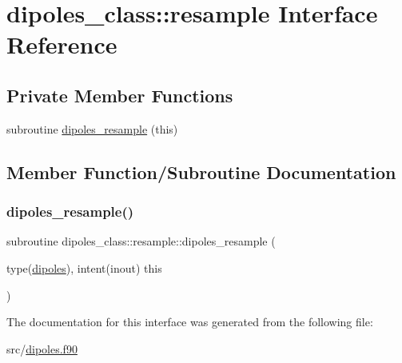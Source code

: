 \hypertarget{interfacedipoles__class_1_1resample}{}\section{dipoles\+\_\+class\+:\+:resample Interface Reference}
\label{interfacedipoles__class_1_1resample}
\subsection*{Private Member Functions}
\begin{DoxyCompactItemize}
\item 
subroutine \hyperlink{interfacedipoles__class_1_1resample_a2ca623c17a0ec8f2d9919d276421f842}{dipoles\+\_\+resample} (this)
\end{DoxyCompactItemize}


\subsection{Member Function/\+Subroutine Documentation}
\mbox{\label{interfacedipoles__class_1_1resample_a2ca623c17a0ec8f2d9919d276421f842}} 
\subsubsection{\texorpdfstring{dipoles\+\_\+resample()}{dipoles\_resample()}}
{\footnotesize\ttfamily subroutine dipoles\+\_\+class\+::resample\+::dipoles\+\_\+resample (\begin{DoxyParamCaption}\item[{type(\hyperlink{structdipoles__class_1_1dipoles}{dipoles}), intent(inout)}]{this }\end{DoxyParamCaption})\hspace{0.3cm}{\ttfamily [private]}}



The documentation for this interface was generated from the following file\+:\begin{DoxyCompactItemize}
\item 
src/\hyperlink{dipoles_8f90}{dipoles.\+f90}\end{DoxyCompactItemize}
